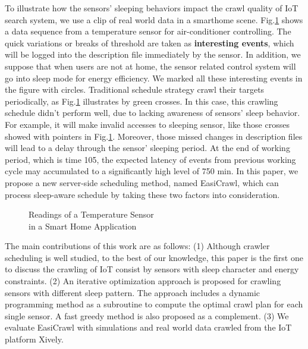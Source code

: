 \documentclass[conference]{IEEEtran}
\begin{document}
To illustrate how the sensors' sleeping behaviors impact the crawl quality of IoT search system, we use a clip of real world data in a smarthome scene.
Fig.\ref{fig:smarthome} shows a data sequence from a temperature sensor for air-conditioner controlling. 
The quick variations or breaks of threshold are taken as \textbf{interesting events}, which will be logged into the description file immediately by the sensor.
In addition, we suppose that when users are not at home, the sensor related control system will go into sleep mode for energy efficiency.
We marked all these interesting events in the figure with circles.
Traditional schedule strategy crawl their targets periodically, as Fig.\ref{fig:smarthome} illustrates by green crosses.
In this case, this crawling schedule didn't perform well, due to lacking awareness of sensors' sleep behavior. 
For example, it will make invalid accesses to sleeping sensor, like those crosses showed with pointers in Fig.\ref{fig:smarthome}. 
Moreover, those missed changes in description files will lead to a delay through the sensor' sleeping period. 
At the end of working period, which is time 105, the expected latency of events from previous working cycle may accumulated to a significantly high level of 750 min.
In this paper, we propose a new server-side scheduling method, named EasiCrawl, which can process sleep-aware schedule by taking these two factors into consideration.

\begin{figure}
	\centering
	\hspace{-3.0em}
	
	\captionsetup{justification=centering}
	\caption{Readings of a Temperature Sensor\\ in a Smart Home Application}
	\vspace{-1.0em}
	\label{fig:smarthome}
\end{figure}

The main contributions of this work are as follows:
(1) Although crawler scheduling is well studied, to the best of our knowledge, this paper is the first one to discuss the crawling of IoT consist by sensors with sleep character and energy constraints.
(2) An iterative optimization approach is proposed for crawling sensors with different sleep pattern. 
The approach includes a dynamic programming method as a subroutine to compute the optimal crawl plan for each single sensor. 
A fast greedy method is also proposed as a complement.
(3) We evaluate EasiCrawl with simulations and real world data crawled from the IoT platform Xively\cite{xively}.
\end{document}
